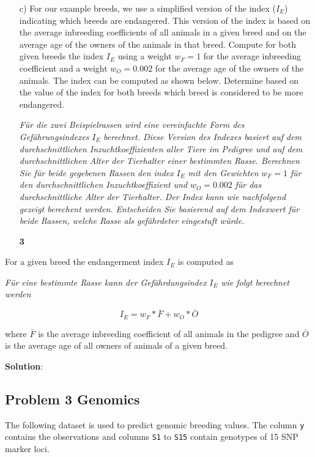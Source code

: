 \documentclass[
]{article}
\newcommand{\points}[1]
{\begin{flushright}\textbf{#1}\end{flushright}}
\newcommand{\solstart}
{\vspace{3ex}\textbf{Solution}:}
\begin{document}
\begin{enumerate}
\item[c)] For our example breeds, we use a simplified version of the index ($I_E$) indicating which breeds are endangered. This version of the index is based on the average inbreeding coefficients of all animals in a given breed and on the average age of the owners of the animals in that breed. Compute for both given breeds the index $I_E$ using a weight $w_F = 1$ for the average inbreeding coefficient and a weight $w_O = 0.002$ for the average age of the owners of the animals. The index can be computed as shown below. Determine based on the value of the index for both breeds which breed is considered to be more endangered.

\textit{Für die zwei Beispielrassen wird eine vereinfachte Form des Gefährungsindexes} $I_E$ \textit{ berechnet. Diese Version des Indexes basiert auf dem durchschnittlichen Inzuchtkoeffizienten aller Tiere im Pedigree und auf dem durchschnittlichen Alter der Tierhalter einer bestimmten Rasse. Berechnen Sie für beide gegebenen Rassen den index } $I_E$ \textit{ mit den Gewichten } $w_F = 1$ \textit{ für den durchschnittlichen Inzuchtkoeffizient und } $w_O = 0.002$ \textit{ für das durchschnittliche Alter der Tierhalter. Der Index kann wie nachfolgend gezeigt berechent werden. Entscheiden Sie basierend auf dem Indexwert für beide Rassen, welche Rasse als gefährdeter eingestuft würde.}
\points{3}
\end{enumerate}

For a given breed the endangerment index \(I_E\) is computed as

\textit{Für eine bestimmte Rasse kann der Gefährdungsindex } \(I_E\)
\textit{ wie folgt berechnet werden}

\[I_E = w_F * \bar{F} + w_O * \bar{O}\]

where \(\bar{F}\) is the average inbreeding coefficient of all animals
in the pedigree and \(\bar{O}\) is the average age of all owners of
animals of a given breed.

\vspace{3ex}
\solstart

\clearpage
\pagebreak

\hypertarget{problem-3-genomics}{%
\subsection{Problem 3 Genomics}\label{problem-3-genomics}}

The following dataset is used to predict genomic breeding values. The
column \texttt{y} contains the observations and columns \texttt{S1} to
\texttt{S15} contain genotypes of 15 SNP marker loci.
\end{document}
